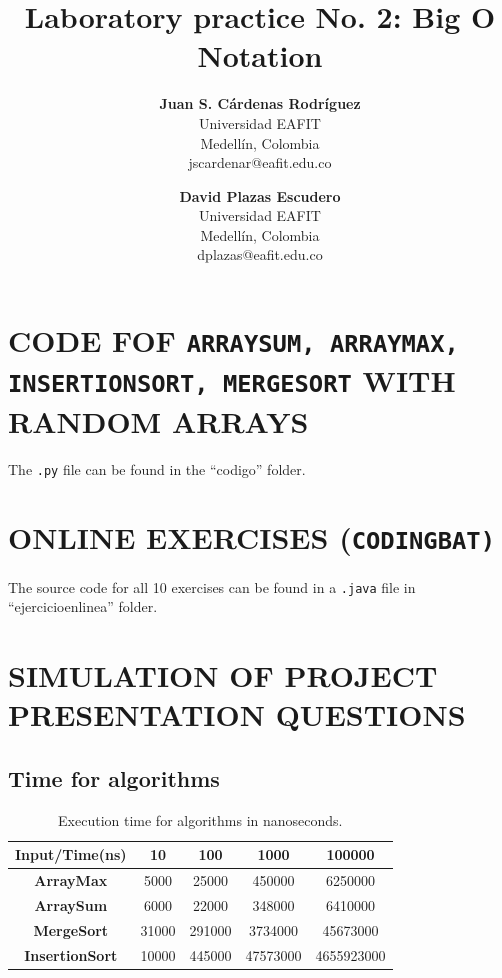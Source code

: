 \documentclass[a4paper,12pt]{article}
\title{\color{Eblue}\textbf{Laboratory practice No. 2: Big O Notation}}
\author{
  \textbf{Juan S. Cárdenas Rodríguez}\\
  Universidad EAFIT\\
  Medellín, Colombia\\
  jscardenar@eafit.edu.co
\and
  \textbf{David Plazas Escudero}\\
  Universidad EAFIT\\
  Medellín, Colombia\\
  dplazas@eafit.edu.co
}
\begin{document}
  \maketitle
  \thispagestyle{fancy}

  \section{CODE FOF \texttt{ARRAYSUM, ARRAYMAX, INSERTIONSORT, MERGESORT} WITH RANDOM ARRAYS}
    The \texttt{.py} file can be found in the ``codigo'' folder.
  \section{ONLINE EXERCISES (\texttt{CODINGBAT)}}
    The source code for all 10 exercises can be found in a \texttt{.java} file in ``ejercicioenlinea'' folder.
  \section{SIMULATION OF PROJECT PRESENTATION QUESTIONS}
    \subsection{Time for algorithms}
    \begin{table}[H]
      \centering
      \caption{Execution time for algorithms in nanoseconds.}
      \label{my-label}
      \begin{tabular}{ccccc}
        \hline
        \textbf{Input/Time(ns)} & \textbf{10} & \textbf{100} & \textbf{1000} & \textbf{100000} \\ \hline
        \textbf{ArrayMax}       & 5000        & 25000        & 450000        & 6250000         \\
        \textbf{ArraySum}       & 6000        & 22000        & 348000        & 6410000         \\
        \textbf{MergeSort}      & 31000       & 291000       & 3734000       & 45673000        \\
        \textbf{InsertionSort}  & 10000       & 445000       & 47573000      & 4655923000      \\ \hline
      \end{tabular}
    \end{table}
\end{document}
